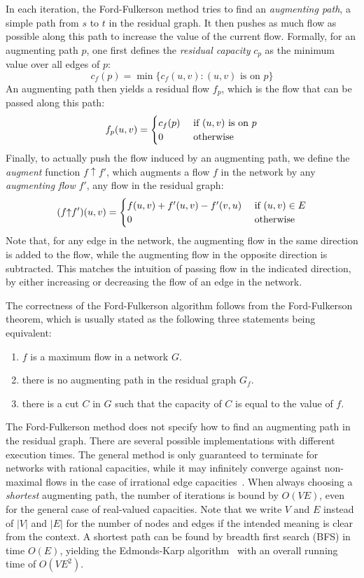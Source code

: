 \documentclass[smallcondensed]{svjour3}     %
\begin{document}
In each iteration, the Ford-Fulkerson method tries to find an \emph{augmenting path}, \ie a simple path from $s$ to $t$ in the residual graph.
It then pushes as much flow as possible along this path to increase the value of the current flow. 
Formally, for an augmenting path $p$, one first defines the \emph{residual capacity} $c_p$ as the minimum value over all edges of $p$:
\[c_f(p) = \min \{c_f(u, v): \text{$(u, v)$ is on  $p$}\}\]
An augmenting path then yields a residual flow $f_p$, which is the flow that can be passed along this path:
\[ f_p (u, v) = 
  \begin{cases}
  c_f(p) \hfill & \text{ if $(u, v)$ is on $p$} \\  
  0 \hfill & \text{ otherwise} \\
  \end{cases} 
\]
\newcommand{\augment}{{\mathbin\uparrow}}%
Finally, to actually push the flow induced by an augmenting path, we define the \emph{augment} function $f\augment f'$, which augments a flow $f$ in the network 
by any \emph{augmenting flow} $f'$, \ie any flow in the residual graph:
\[ (f \augment f') (u, v) = 
  \begin{cases}
  f (u, v) + f'(u, v) - f'(v, u) \hfill & \text{ if $(u, v) \in E$} \\  
  0 \hfill & \text{ otherwise} \\
  \end{cases} 
\]
Note that, for any edge in the network, the augmenting flow in the same direction is added to the flow, while the augmenting flow in the opposite direction is subtracted. 
This matches the intuition of passing flow in the indicated direction, by either increasing or decreasing the flow of an edge in the network.

The correctness of the Ford-Fulkerson algorithm follows from the Ford-Fulkerson theorem, which is usually stated as the following three statements being equivalent:
\begin{enumerate}
\item $f$ is a maximum flow in a network $G$.
\item there is no augmenting path in the residual graph $G_f$.
\item there is a cut $C$ in $G$ such that the capacity of $C$ is equal to the value of $f$.
\end{enumerate}

The Ford-Fulkerson method does not specify how to find an augmenting path in the residual graph. There are several possible implementations with different execution times. The general method is only guaranteed to terminate for networks with rational capacities, while it may infinitely converge against non-maximal flows in the case of irrational edge capacities~\cite{FF56,Zwick95}. When always choosing a \emph{shortest} augmenting path, the number of iterations is bound by $O(VE)$, even for the general case of real-valued capacities. Note that we write $V$ and $E$ instead of $|V|$ and $|E|$ for the number of nodes and edges if the intended meaning is clear from the context.
A shortest path can be found by breadth first search (BFS) in time $O(E)$, yielding the Edmonds-Karp algorithm~\cite{EK72} with an overall running time of $O(VE^2)$. 
\end{document}
